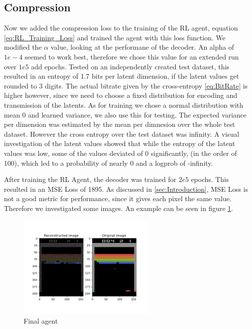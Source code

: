 \subsection{Compression}
Now we added the compression loss to the training of the RL agent, equation
\ref{eq:RL_Training_Loss} and trained the agent with this loss function. We
modified the $\alpha$ value, looking at the performane of the decoder. An alpha
of $1e-4$ seemed to work best, therefore we chose this value for an
extended run over $1e5$ add epochs. Tested on an independently created test
dataset, this resulted in an entropy of 1.7 bits per latent dimension, if the
latent values get rounded to 3 digits. The actual bitrate given by the
cross-entropy \ref{eq:BitRate} is higher however, since we need to choose a
fixed distribution for encoding and transmission of the latents. As for training
we chose a normal distribution with mean 0 and learned variance, we also use
this for testing. The expected variance per dimension was estimated by the mean
per dimnesion over the whole test dataset. However the cross entropy over the
test dataset was infinity. A visual investigation of the latent values showed
that while the entropy of the latent values was low, some of the values deviated
of 0 significantly, (in the order of 100), which led to a probability of nearly
0 and a logprob of -infinity.

After training the RL Agent, the decoder was trained for $2e5$ epochs. This
resulted in an MSE Loss of 1895. As discussed in \ref{sec:Introduction}, MSE
Loss is not a good metric for performance, since it gives each pixel the same
value. Therefore we investigated some images. An example can be seen in figure
\ref{fig:final_agent}.
\begin{figure}[H]
    \centering
    \includegraphics[width=0.6\textwidth]{images/orig_reconstructed_final_agent.png}
    \caption{Final agent}
    \label{fig:final_agent}
\end{figure}

